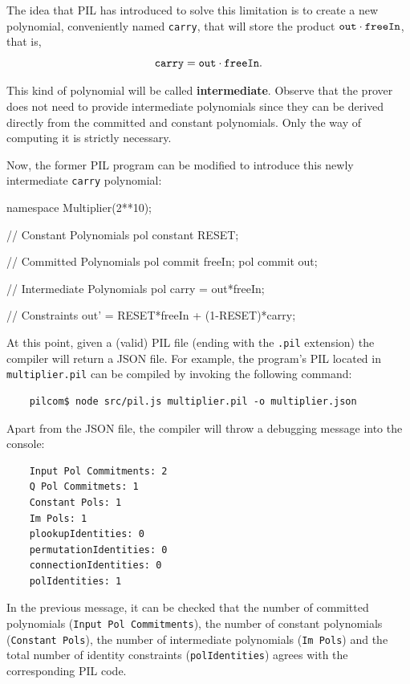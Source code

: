 The idea that PIL has introduced to solve this limitation is to create a new polynomial, conveniently named \texttt{carry}, that will store the product $\mathtt{out} \cdot \mathtt{freeIn}$, that is,
\[
\mathtt{carry} = \mathtt{out} \cdot \mathtt{freeIn}.
\]

This kind of polynomial will be called \textbf{intermediate}. Observe that the prover does not need to provide intermediate polynomials since they can be derived directly from the committed and constant polynomials. Only the way of computing it is strictly necessary. 

Now, the former PIL program can be modified to introduce this newly intermediate \texttt{carry} polynomial:
\begin{pil}
    namespace Multiplier(2**10);
    
    // Constant Polynomials
    pol constant RESET;
    
    // Committed Polynomials
    pol commit freeIn;
    pol commit out;
    
    // Intermediate Polynomials
    pol carry = out*freeIn;
    
    // Constraints
    out' = RESET*freeIn + (1-RESET)*carry;
\end{pil}

At this point, given a (valid) PIL file (ending with the \texttt{.pil} extension) the \pilcom compiler will return a JSON file. %
For example, the \Multiplier program's PIL located in \texttt{multiplier.pil} can be compiled by invoking the following command:

\begin{lstlisting}
    pilcom$ node src/pil.js multiplier.pil -o multiplier.json
\end{lstlisting}

Apart from the JSON file, the compiler will throw a debugging message into the console:

\begin{lstlisting}
    Input Pol Commitments: 2
    Q Pol Commitmets: 1
    Constant Pols: 1
    Im Pols: 1
    plookupIdentities: 0
    permutationIdentities: 0
    connectionIdentities: 0
    polIdentities: 1
\end{lstlisting}

In the previous message, it can be checked that the number of committed polynomials (\texttt{Input Pol Commitments}), the number of constant polynomials (\texttt{Constant Pols}), the number of intermediate polynomials (\texttt{Im Pols}) and the total number of identity constraints (\texttt{polIdentities}) agrees with the corresponding PIL code. 



